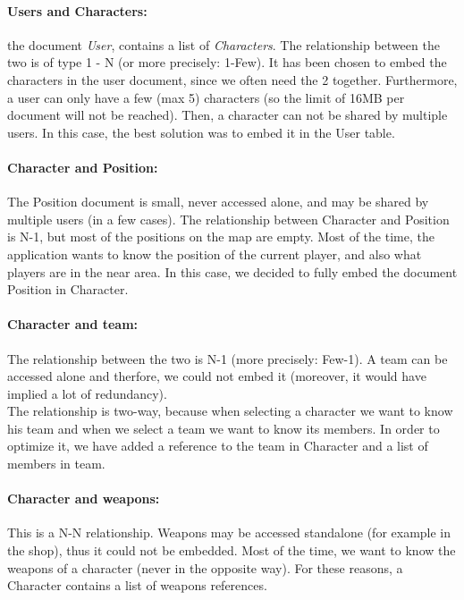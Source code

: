 \documentclass[a4paper, 11pt]{article}
\begin{document}
\paragraph{Users and Characters:} the document \textit{User}, contains a list of \textit{Characters}. The relationship between the two is of type 1 - N (or more precisely: 1-Few). It has been chosen to embed the characters in the user document, since we often need the 2 together. Furthermore, a user can only have a few (max 5) characters (so the limit of 16MB per document will not be reached). Then, a character can not be shared by multiple users. In this case, the best solution was to embed it in the User table.

\paragraph{Character and Position:}
The Position document is small, never accessed alone, and may be shared by multiple users (in a few cases). The relationship between Character and Position is N-1, but most of the positions on the map are empty. Most of the time, the application wants to know the position of the current player, and also what players are in the near area. In this case, we decided to fully embed the document Position in Character.

\paragraph{Character and team:}
The relationship between the two is N-1 (more precisely: Few-1). A team can be accessed alone and therfore, we could not embed it (moreover, it would have implied a lot of redundancy).\\
The relationship is two-way, because when selecting a character we want to know his team and when we select a team we want to know its members.
In order to optimize it, we have added a reference to the team in Character and a list of members in team.

\paragraph{Character and weapons:}
This is a N-N relationship. Weapons may be accessed standalone (for example in the shop), thus it could not be embedded. Most of the time, we want to know the weapons of a character (never in the opposite way). For these reasons, a Character contains a list of weapons references.
\end{document}
